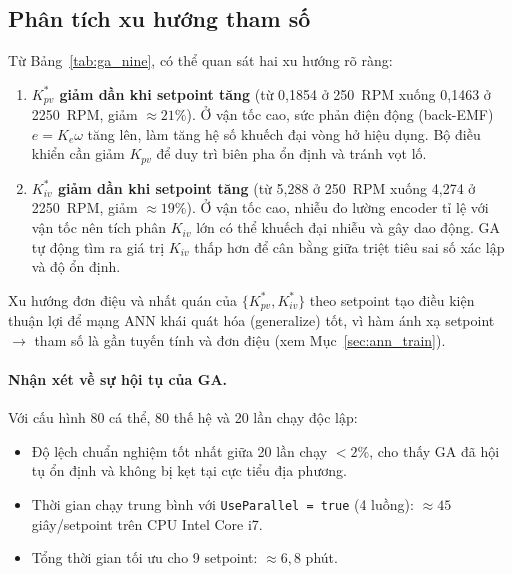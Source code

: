 \subsection{Phân tích xu hướng tham số}
\label{subsec:ga_trend}

Từ Bảng~\ref{tab:ga_nine}, có thể quan sát hai xu hướng rõ ràng:

\begin{enumerate}
    \item \textbf{$K_{pv}^*$ giảm dần khi setpoint tăng}
    (từ 0,1854 ở 250~RPM xuống 0,1463 ở 2250~RPM, giảm $\approx 21\%$).
    Ở vận tốc cao, sức phản điện động (back-EMF) $e = K_e \omega$ tăng lên,
    làm tăng hệ số khuếch đại vòng hở hiệu dụng. Bộ điều khiển cần giảm
    $K_{pv}$ để duy trì biên pha ổn định và tránh vọt lố.

    \item \textbf{$K_{iv}^*$ giảm dần khi setpoint tăng}
    (từ 5,288 ở 250~RPM xuống 4,274 ở 2250~RPM, giảm $\approx 19\%$).
    Ở vận tốc cao, nhiễu đo lường encoder tỉ lệ với vận tốc nên tích phân
    $K_{iv}$ lớn có thể khuếch đại nhiễu và gây dao động. GA tự động tìm
    ra giá trị $K_{iv}$ thấp hơn để cân bằng giữa triệt tiêu sai số xác
    lập và độ ổn định.
\end{enumerate}

Xu hướng đơn điệu và nhất quán của $\{K_{pv}^*, K_{iv}^*\}$ theo setpoint
tạo điều kiện thuận lợi để mạng ANN khái quát hóa (generalize) tốt, vì
hàm ánh xạ setpoint $\to$ tham số là gần tuyến tính và đơn điệu
(xem Mục~\ref{sec:ann_train}).

\paragraph{Nhận xét về sự hội tụ của GA.}
Với cấu hình 80 cá thể, 80 thế hệ và 20 lần chạy độc lập:
\begin{itemize}
    \item Độ lệch chuẩn nghiệm tốt nhất giữa 20 lần chạy $< 2\%$,
    cho thấy GA đã hội tụ ổn định và không bị kẹt tại cực tiểu địa phương.
    \item Thời gian chạy trung bình với \texttt{UseParallel = true}
    (4 luồng): $\approx 45$ giây/setpoint trên CPU Intel Core i7.
    \item Tổng thời gian tối ưu cho 9 setpoint: $\approx 6{,}8$ phút.
\end{itemize}


